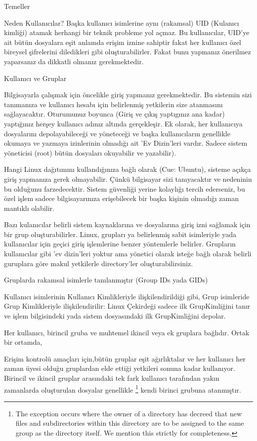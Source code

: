 \begin{section}{Temeller}
\begin{subsection}{Neden Kullanıcılar?}
Başka kullanıcı isimlerine aynı (rakamsal) UID (Kulanıcı kimliği) atamak herhangi bir teknik probleme yol açmaz. Bu kullanıcılar, UID'ye ait bütün dosyalara eşit anlamda erişim iznine sahiptir fakat her kullanıcı özel bireysel şifrelerini diledikleri gibi oluşturabilirler. Fakat bunu yapmanız önerilmez yaparsanız da dikkatli olmanız gerekmektedir.
\end{subsection}
\begin{subsection}{Kullanıcı ve Gruplar}

Bilgisayarla çalışmak için öncelikle giriş yapmanız gerekmektedir. Bu sistemin sizi tanımanıza ve kullanıcı hesabı için belirlenmiş yetkilerin size atanmasını sağlayacaktır. Oturumunuz boyunca (Giriş ve çıkış yaptıgınız ana kadar) yaptığınız herşey kullanıcı adınız altında gerçekleşir. Ek olarak, her kullanıcıya dosyalarını depolayabileceği ve yöneteceği ve başka kullanıcıların genellikle okumaya ve yazmaya izinlerinin olmadığı ait 'Ev Dizin'leri vardır. Sadece sistem yöneticisi (root) bütün dosyaları okuyabilir ve yazabilir).

Hangi Linux dağıtımını kullandığınıza bağlı olarak (Cue: Ubuntu), sisteme açıkça giriş yapmanıza gerek olmayabilir. Çünkü bilgisayar sizi tanıyacaktır ve nedeninin bu olduğunu farzedecektir. Sistem güvenliği yerine kolaylığı tercih ederseniz, bu özel işlem sadece bilgisayarınıza erişebilecek bir başka kişinin olmadığı zaman mantıklı olabilir.

Bazı kulanıcılar belirli sistem kaynaklarına ve dosyalarına giriş izni sağlamak için bir grup oluşturabilirler. Linux, grupları ya belirlenmiş sabit isimleriyle yada kullanıcılar için geçici giriş işlemlerine benzer yöntemlerle belirler. Grupların kullanıcılar gibi 'ev dizin'leri yoktur ama yönetici olarak isteğe bağlı olarak belirli guruplara göre makul yetkilerle directory'ler oluşturabilirsiniz.

Gruplarda rakamsal isimlerle tanılanmıştır (Group IDs yada GIDs)

Kullanıcı isimlerinin Kullanıcı Kimlikleriyle ilişkilendirildiği gibi, Grup isimleride Grup Kimlikleriyle ilişkilendirilir: Linux Çekirdeği sadece ilk GrupKimliğini tanır ve işlem bilgisindeki yada sistem dosyasındaki ilk GrupKimliğini depolar.

Her kullanıcı, birincil gruba ve muhtemel ikincil veya ek gruplara bağlıdır. Ortak bir ortamda,

Erişim kontrolü amaçları için,bütün gruplar eşit ağırlıktalar ve her kullanıcı her zaman üyesi olduğu gruplardan elde ettiği yetkileri sonuna kadar kullanıyor. Birincil ve ikincil gruplar arasındaki tek fark kullanıcı tarafından yakın zamanlarda oluşturulan dosyalar genellikle
\footnote{The exception occurs where the owner of a directory has decreed that new files and subdirectories within this directory are to be assigned to the same group as the directory itself. We mention this strictly for completeness.} kendi birinci grubuna atanmıştır.


\end{subsection}
\end{section}
